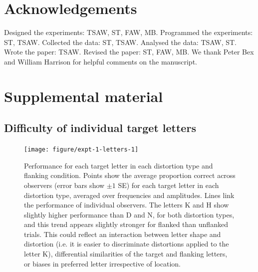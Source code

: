 \documentclass[doc, 11pt,a4paper,natbib]{apa6}\usepackage[]{graphicx}\usepackage[]{color}
\newenvironment{knitrout}{}{} %
\begin{document}
\section{Acknowledgements}

Designed the experiments: TSAW, ST, FAW, MB.
Programmed the experiments: ST, TSAW.
Collected the data: ST, TSAW.
Analysed the data: TSAW, ST.
Wrote the paper: TSAW.
Revised the paper: ST, FAW, MB.
We thank Peter Bex and William Harrison for helpful comments on the manuscript.

\newpage

\section{Supplemental material}

\subsection{Difficulty of individual target letters}



\begin{knitrout}
\color{fgcolor}\begin{figure}
\texttt{[image: figure/expt-1-letters-1]} \caption[Performance for each target letter in each distortion type and flanking condition]{Performance for each target letter in each distortion type and flanking condition.
	Points show the average proportion correct across observers (error bars show $\pm 1$ SE) for each target letter in each distortion type, averaged over frequencies and amplitudes.
  Lines link the performance of individual observers.
	The letters K and H show slightly higher performance than D and N, for both distortion types, and this trend appears slightly stronger for flanked than unflanked trials.
	This could reflect an interaction between letter shape and distortion (i.e. it is easier to discriminate distortions applied to the letter K), differential similarities of the target and flanking letters, or biases in preferred letter irrespective of location.}\label{fig:expt-1-letters}
\end{figure}


\end{knitrout}
\end{document}
